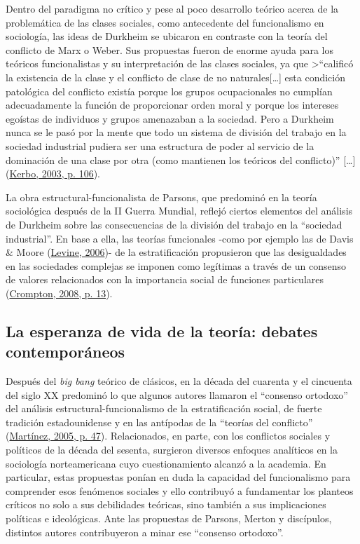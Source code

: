 \documentclass[
]{article}
\begin{document}
Dentro del paradigma no crítico y pese al poco desarrollo teórico acerca de la problemática de las clases sociales, como antecedente del funcionalismo en sociología, las ideas de Durkheim se ubicaron en contraste con la teoría del conflicto de Marx o Weber. Sus propuestas fueron de enorme ayuda para los teóricos funcionalistas y su interpretación de las clases sociales, ya que \textgreater{}``calificó la existencia de la clase y el conflicto de clase de no naturales{[}\ldots{]} esta condición patológica del conflicto existía porque los grupos ocupacionales no cumplían adecuadamente la función de proporcionar orden moral y porque los intereses egoístas de individuos y grupos amenazaban a la sociedad. Pero a Durkheim nunca se le pasó por la mente que todo un sistema de división del trabajo en la sociedad industrial pudiera ser una estructura de poder al servicio de la dominación de una clase por otra (como mantienen los teóricos del conflicto)'' {[}\ldots{]} (\protect\hyperlink{ref-Kerbo2003}{Kerbo, 2003, p. 106}).

La obra estructural-funcionalista de Parsons, que predominó en la teoría sociológica después de la II Guerra Mundial, reflejó ciertos elementos del análisis de Durkheim sobre las consecuencias de la división del trabajo en la ``sociedad industrial''. En base a ella, las teorías funcionales -como por ejemplo las de Davis \& Moore (\protect\hyperlink{ref-Levine2006}{Levine, 2006})- de la estratificación propusieron que las desigualdades en las sociedades complejas se imponen como legítimas a través de un consenso de valores relacionados con la importancia social de funciones particulares (\protect\hyperlink{ref-Crompton2008}{Crompton, 2008, p. 13}).

\hypertarget{esperanza}{%
\subsection{La esperanza de vida de la teoría: debates contemporáneos}\label{esperanza}}

Después del \emph{big bang} teórico de clásicos, en la década del cuarenta y el cincuenta del siglo XX predominó lo que algunos autores llamaron el ``consenso ortodoxo'' del análisis estructural-funcionalismo de la estratificación social, de fuerte tradición estadounidense y en las antípodas de la ``teorías del conflicto'' (\protect\hyperlink{ref-Martinez2005}{Martínez, 2005, p. 47}). Relacionados, en parte, con los conflictos sociales y políticos de la década del sesenta, surgieron diversos enfoques analíticos en la sociología norteamericana cuyo cuestionamiento alcanzó a la academia. En particular, estas propuestas ponían en duda la capacidad del funcionalismo para comprender esos fenómenos sociales y ello contribuyó a fundamentar los planteos críticos no solo a sus debilidades teóricas, sino también a sus implicaciones políticas e ideológicas. Ante las propuestas de Parsons, Merton y discípulos, distintos autores contribuyeron a minar ese ``consenso ortodoxo''.
\end{document}

